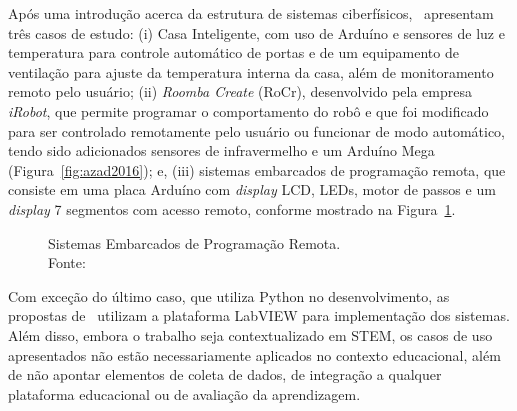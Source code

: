 Após uma introdução acerca da estrutura de sistemas ciberfísicos,~\cite{Azad:2016} apresentam três casos de estudo: (i) Casa Inteligente, com uso de Arduíno e sensores de luz e temperatura para controle automático de portas e de um equipamento de ventilação para ajuste da temperatura interna da casa, além de monitoramento remoto pelo usuário; (ii) \textit{Roomba Create} (RoCr), desenvolvido pela empresa \textit{iRobot}, que permite programar o comportamento do robô e que foi modificado para ser controlado remotamente pelo usuário ou funcionar de modo automático, tendo sido adicionados sensores de infravermelho e um Arduíno Mega (Figura~\ref{fig:azad2016}); e, (iii) sistemas embarcados de programação remota, que consiste em uma placa Arduíno com \textit{display} LCD, LEDs, motor de passos e um \textit{display} 7 segmentos com acesso remoto, conforme mostrado na Figura~\ref{fig:azad2016_remote}.

\begin{figure}[htb]
\center
{}
\qquad
{}
\captionsetup{justification=centering}
\caption{Sistemas Embarcados de Programação Remota. \\Fonte:~\cite{Azad:2016}}
\label{fig:azad2016_remote}
\end{figure}

Com exceção do último caso, que utiliza Python no desenvolvimento, as propostas de~\cite{Azad:2016} utilizam a plataforma LabVIEW para implementação dos sistemas. Além disso, embora o trabalho seja contextualizado em STEM, os casos de uso apresentados não estão necessariamente aplicados no contexto educacional, além de não apontar elementos de coleta de dados, de integração a qualquer plataforma educacional ou de avaliação da aprendizagem.

